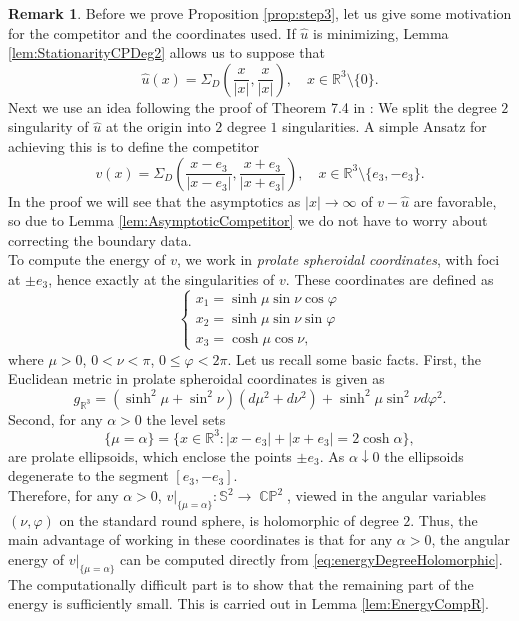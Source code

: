 \documentclass[11pt]{article}
\theoremstyle{plain}
\numberwithin{equation}{section}
\theoremstyle{definition}
\newtheorem{remark}[theorem]{Remark}
\def \R {\mathbb{R}}
\def \mb{\mathbb}
\DeclareMathOperator{\CP}{\mathbb{CP}}
\begin{document}
\begin{remark}
    Before we prove Proposition \ref{prop:step3}, let us give some motivation for the competitor and the coordinates used. If $\hat u$ is minimizing, Lemma \ref{lem:StationarityCPDeg2} allows us to suppose that
    \[
    \hat u(x)=\Sigma_{D}\left(\frac{x}{|
    x|},\frac{x}{|x|}\right),\quad  x \in \R^3\setminus \{0\}.
    \]
    Next we use an idea following the proof of Theorem 7.4 in \cite{Brezis1986}: We split the degree $2$ singularity of $\hat u$ at the origin into $2$ degree $1$ singularities. A simple Ansatz for achieving this is to define the competitor
    \[
    v(x)= \Sigma_{D}\left(\frac{x-e_3}{|
    x-e_3|},\frac{x+e_3}{|x+e_3|}\right),\quad  x \in \R^3\setminus \{e_3,-e_3\}.
    \]
    In the proof we will see that the asymptotics as $|x| \to \infty$ of $v-\hat u$ are favorable, so due to Lemma \ref{lem:AsymptoticCompetitor} we do not have to worry about correcting the boundary data.\\
    To compute the energy of $v$, we work in \textit{prolate spheroidal coordinates}, with foci at $\pm e_3$, hence exactly at the singularities of $v$. These coordinates are defined as
    \[
    \begin{cases}
        x_1=\sinh \mu \sin \nu\cos\varphi\\
        x_2=\sinh \mu \sin \nu\sin \varphi\\
        x_3=\cosh \mu \cos \nu,
    \end{cases}
    \]
    where $\mu >0$, $0<\nu <\pi$, $0\leq \varphi <2\pi$. Let us recall some basic facts. First, the Euclidean metric in prolate spheroidal coordinates is given as
    \begin{equation}
        \label{eq:MetricInprolate}
        g_{\R^3}=(\sinh^2\mu +\sin^2\nu)(d\mu^2+d\nu^2)+\sinh^2\mu\sin^2\nu d\varphi^2.
    \end{equation}
    Second, for any $\alpha >0$ the level sets
    \[
    \{\mu =\alpha\}=\{x\in \R^3:|x-e_3|+|x+e_3|=2\cosh \alpha\},
    \]
    are prolate ellipsoids, which enclose the points $\pm e_3$. As $\alpha \downarrow 0$ the ellipsoids degenerate to the segment $[e_3,-e_3]$.\\
    Therefore, for any $\alpha >0$, $v|_{{\{\mu=\alpha\}}}:\mb S^2 \to \CP^2$, viewed in the angular variables $(\nu,\varphi)$ on the standard round sphere, is holomorphic of degree $2$. Thus, the main advantage of working in these coordinates is that for any $\alpha>0$, the angular energy of $v|_{{\{\mu=\alpha\}}}$ can be computed directly from \eqref{eq:energyDegreeHolomorphic}. The computationally difficult part is to show that the remaining part of the energy is sufficiently small. This is carried out in Lemma \ref{lem:EnergyCompR}.
\end{remark}
\end{document}

